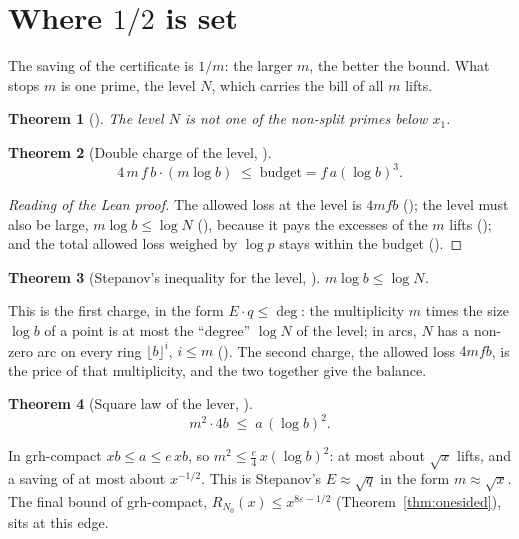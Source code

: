 \documentclass[11pt]{article}
\newtheorem{theorem}{Theorem}[section]
\theoremstyle{definition}
\theoremstyle{remark}
\begin{document}
\section{Where $1/2$ is set}\label{sec:lever}

The saving of the certificate is $1/m$: the larger $m$, the better the bound. What stops $m$ is one
prime, the level $N$, which carries the bill of all $m$ lifts.

\begin{theorem}[]
The level $N$ is not one of the non-split primes below $x_1$.
\end{theorem}

\begin{theorem}[Double charge of the level, ]
\[
4\,m\,f\,b\cdot(m\log b)\;\le\;\mathrm{budget}=f\,a(\log b)^3.
\]
\end{theorem}
\begin{proof}[Reading of the Lean proof]
The allowed loss at the level is $4mfb$ (); the level must also be large,
$m\log b\le\log N$ (), because it pays the excesses of the $m$ lifts
(); and the total allowed loss weighed by $\log p$ stays within the
budget ().
\end{proof}

\begin{theorem}[Stepanov's inequality for the level, ]
$m\log b\le\log N$.
\end{theorem}
This is the first charge, in the form $E\cdot q\le\deg$: the multiplicity $m$ times the size
$\log b$ of a point is at most the ``degree'' $\log N$ of the level; in arcs, $N$ has a non-zero arc
on every ring $\lfloor b\rfloor^i$, $i\le m$ (). The second charge, the
allowed loss $4mfb$, is the price of that multiplicity, and the two together give the balance.

\begin{theorem}[Square law of the lever, ]
\[
m^2\cdot 4b\;\le\;a\,(\log b)^2 .
\]
\end{theorem}
In grh-compact $x b\le a\le e\,x b$, so $m^2\le \tfrac e4\,x(\log b)^2$: at most about $\sqrt x$
lifts, and a saving of at most about $x^{-1/2}$. This is Stepanov's $E\approx\sqrt q$ in the form
$m\approx\sqrt x$. The final bound of grh-compact,
$R_{N_0}(x)\le x^{8\varepsilon-1/2}$ (Theorem~\ref{thm:onesided}), sits at this edge.
\end{document}
